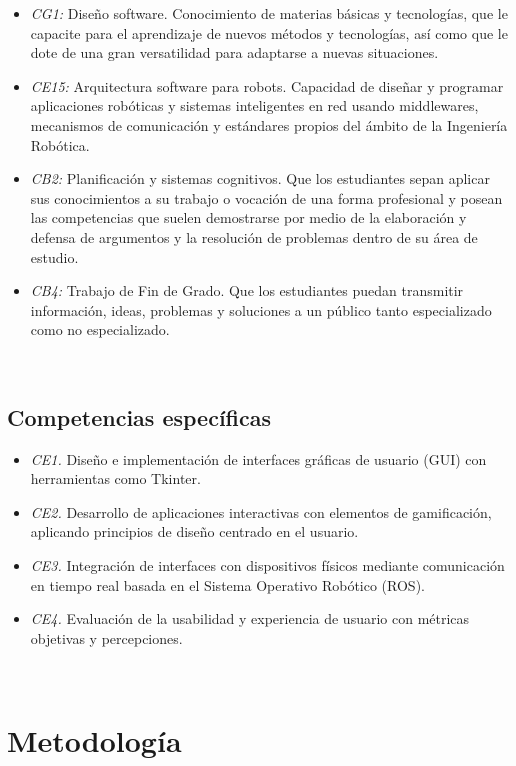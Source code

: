 \begin{itemize}
    \item \textit{CG1:} Diseño software. Conocimiento de materias básicas y tecnologías, que le capacite para el aprendizaje de nuevos métodos y tecnologías, así como que le dote de una gran versatilidad para adaptarse a nuevas situaciones.
    \item \textit{CE15:} Arquitectura software para robots. Capacidad de diseñar y programar aplicaciones robóticas y sistemas inteligentes en red usando middlewares, mecanismos de comunicación y estándares propios del ámbito de la Ingeniería Robótica.
    \item \textit{CB2:} Planificación y sistemas cognitivos. Que los estudiantes sepan aplicar sus conocimientos a su trabajo o vocación de una forma profesional y posean las competencias que suelen demostrarse por medio de la elaboración y defensa de argumentos y la resolución de problemas dentro de su área de estudio.
    \item \textit{CB4:} Trabajo de Fin de Grado. Que los estudiantes puedan transmitir información, ideas, problemas y soluciones a un público tanto especializado como no especializado.
\end{itemize}\

\subsection{Competencias específicas}
\label{sec:competencias}

\begin{itemize}
    \item \textit{CE1.} Diseño e implementación de interfaces gráficas de usuario (GUI) con herramientas como Tkinter.
    \item \textit{CE2.} Desarrollo de aplicaciones interactivas con elementos de gamificación, aplicando principios de diseño centrado en el usuario.
    \item \textit{CE3.} Integración de interfaces con dispositivos físicos mediante comunicación en tiempo real basada en el Sistema Operativo Robótico (ROS).
    \item \textit{CE4.} Evaluación de la usabilidad y experiencia de usuario con métricas objetivas y percepciones.
\end{itemize}\

\section{Metodología}
\label{sec:metodologia}

